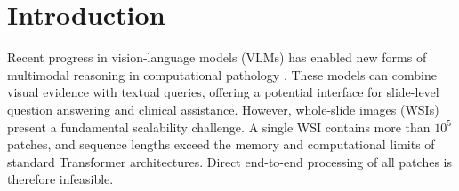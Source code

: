 \documentclass[runningheads]{llncs}
\begin{document}
\section{Introduction}

Recent progress in vision-language models (VLMs) has enabled new forms of multimodal reasoning in computational pathology \citep{Lu2024VisualLanguage}. These models can combine visual evidence with textual queries, offering a potential interface for slide-level question answering and clinical assistance. However, whole-slide images (WSIs) present a fundamental scalability challenge. A single WSI contains more than 
$10^5$ patches, and sequence lengths exceed the memory and computational limits of standard Transformer architectures. Direct end-to-end processing of all patches is therefore infeasible.

\end{document}
